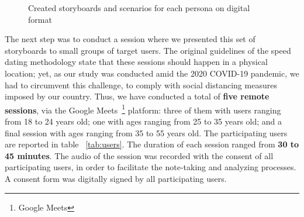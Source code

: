 \begin{figure}[htbp]
	\centering
	 \qquad
		 \qquad
	\caption{Created storyboards and scenarios for each persona on digital format}
	\label{fig:digitalstoryboard}
\end{figure}



The next step was to conduct a session where we presented this set of storyboards to small groups of target users. The original guidelines of the speed dating methodology state that these sessions should happen in a physical location; yet, as our study was conducted amid the 2020 COVID-19 pandemic, we had to circumvent this challenge, to comply with social distancing measures imposed by our country. Thus, we have conducted a total of \textbf{five remote sessions}, via the Google Meets~\footnote{Google Meets} platform: three of them with users ranging from 18 to 24 years old; one with ages ranging from 25 to 35 years old; and a final session with ages ranging from 35 to 55 years old. The participating users are reported in table ~\ref{tab:users}. The duration of each session ranged from \textbf{30 to 45 minutes}. The audio of the session was recorded with the consent of all participating users, in order to facilitate the note-taking and analyzing processes. A consent form was digitally signed by all participating users.

